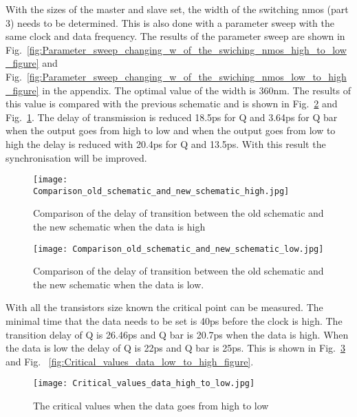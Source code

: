 With the sizes of the master and slave set, the width of the switching nmos (part 3) needs to be determined. This is also done with a parameter sweep with the same clock and data frequency. The results of the parameter sweep are shown in Fig.~\ref{fig:Parameter_sweep_changing_w_of_the_swiching_nmos_high_to_low_figure} and Fig.~\ref{fig:Parameter_sweep_changing_w_of_the_swiching_nmos_low_to_high_figure} in the appendix. The optimal value of the width is 360nm. The results of this value is compared with the previous schematic and is shown in Fig.~\ref{fig:Comparison_old_schematic_and_new_schematic_low_figure} and Fig.~\ref{fig:Comparison_old_schematic_and_new_schematic_high_figure}. The delay of transmission is reduced 18.5ps for Q and 3.64ps for Q bar when the output goes from high to low and when the output goes from low to high the delay is reduced with 20.4ps for Q and 13.5ps. With this result the synchronisation will be improved.

\begin{figure}[h]
\texttt{[image: Comparison\_old\_schematic\_and\_new\_schematic\_high.jpg]}
\caption{Comparison of the delay of transition between the old schematic and the new schematic when the data is high }
\label{fig:Comparison_old_schematic_and_new_schematic_high_figure}
\end{figure}

\begin{figure}[h]
\texttt{[image: Comparison\_old\_schematic\_and\_new\_schematic\_low.jpg]}
\caption{Comparison of the delay of transition between the old schematic and the new schematic when the data is low.}
\label{fig:Comparison_old_schematic_and_new_schematic_low_figure}
\end{figure}

With all the transistors size known the critical point can be measured. The minimal time that the data needs to be set is 40ps before the clock is high. The transition delay of Q is 26.46ps and Q bar is 20.7ps when the data is high. When the data is low the delay of Q is 22ps and Q bar is 25ps. This is shown in Fig.~\ref{fig:Critical_values_data_high_to_low_figure} and Fig. ~\ref{fig:Critical_values_data_low_to_high_figure}. 

\begin{figure}[h]
\texttt{[image: Critical\_values\_data\_high\_to\_low.jpg]}
\caption{The critical values when the data goes from high to low}
\label{fig:Critical_values_data_high_to_low_figure}
\end{figure}

